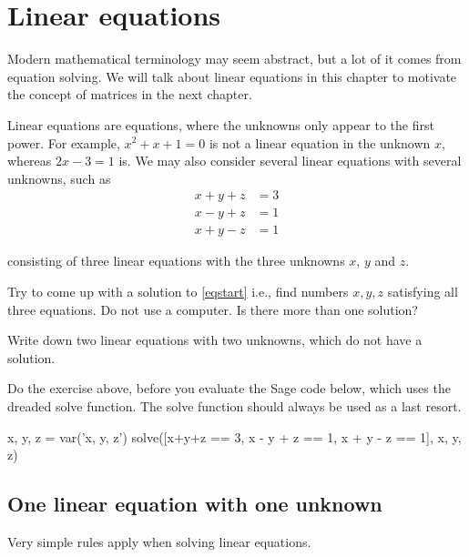 \documentclass{article}
\begin{document}
\chapter{Linear equations}


Modern mathematical terminology may seem abstract, but a lot of it comes from
equation solving. We will talk about linear equations in this chapter to
motivate the concept of matrices in the next chapter.

Linear equations are equations, where the unknowns
only appear to the first power. For example,
$x^2 + x + 1 = 0$ is not a linear equation in the unknown $x$, whereas
$2 x - 3 = 1$ is.
We may also consider several linear equations with several unknowns, such as
\begin{align}
x + y + z &= 3\\
x - y + z &= 1\\ \label{eqstart}
x + y - z &= 1
\end{align}

consisting of three linear equations with the three unknowns $x$, $y$ and $z$.

\beginshex
Try to come up with a solution to \eqref{eqstart} i.e., find
numbers $x, y, z$ satisfying all three equations. Do not use a computer.
Is there more than one solution?

Write down two linear equations with two unknowns, which do not
have a solution.
\endshex

Do the exercise above, before you evaluate the Sage code below, which uses
the dreaded solve function. The solve function should always be used as a last resort.

\begin{sage}
x, y, z = var('x, y, z')
solve([x+y+z == 3, x - y + z == 1, x + y - z == 1],
x, y, z)
\end{sage}



\section{One linear equation with one unknown}

Very simple rules apply when solving linear equations.
\end{document}
